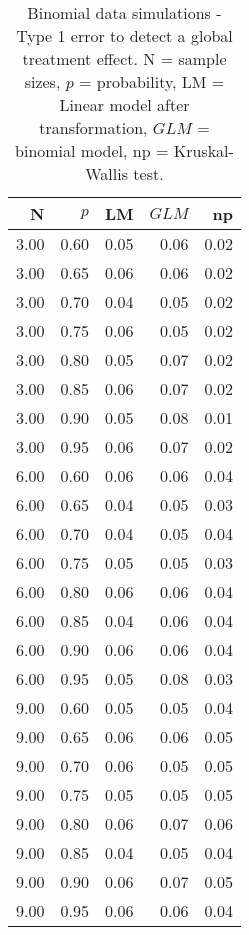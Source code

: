 \begin{table}
\centering
\caption[Binomial data simulations - Type 1 error to detect a global treatment effect.]{Binomial data simulations - Type 1 error to detect a global treatment effect. N = sample sizes, 
             $p$ = probability, LM = Linear model after transformation, 
             $GLM$ = binomial model, np = Kruskal-Wallis test.} 
\label{tab:t1_glob_p}
{\footnotesize
\begin{tabular}{rrrrr}
  \hline
N & $p$ & LM & $GLM$ & np \\ 
  \hline
3.00 & 0.60 & 0.05 & 0.06 & 0.02 \\ 
  3.00 & 0.65 & 0.06 & 0.06 & 0.02 \\ 
  3.00 & 0.70 & 0.04 & 0.05 & 0.02 \\ 
  3.00 & 0.75 & 0.06 & 0.05 & 0.02 \\ 
  3.00 & 0.80 & 0.05 & 0.07 & 0.02 \\ 
  3.00 & 0.85 & 0.06 & 0.07 & 0.02 \\ 
  3.00 & 0.90 & 0.05 & 0.08 & 0.01 \\ 
  3.00 & 0.95 & 0.06 & 0.07 & 0.02 \\ 
  6.00 & 0.60 & 0.06 & 0.06 & 0.04 \\ 
  6.00 & 0.65 & 0.04 & 0.05 & 0.03 \\ 
  6.00 & 0.70 & 0.04 & 0.05 & 0.04 \\ 
  6.00 & 0.75 & 0.05 & 0.05 & 0.03 \\ 
  6.00 & 0.80 & 0.06 & 0.06 & 0.04 \\ 
  6.00 & 0.85 & 0.04 & 0.06 & 0.04 \\ 
  6.00 & 0.90 & 0.06 & 0.06 & 0.04 \\ 
  6.00 & 0.95 & 0.05 & 0.08 & 0.03 \\ 
  9.00 & 0.60 & 0.05 & 0.05 & 0.04 \\ 
  9.00 & 0.65 & 0.06 & 0.06 & 0.05 \\ 
  9.00 & 0.70 & 0.06 & 0.05 & 0.05 \\ 
  9.00 & 0.75 & 0.05 & 0.05 & 0.05 \\ 
  9.00 & 0.80 & 0.06 & 0.07 & 0.06 \\ 
  9.00 & 0.85 & 0.04 & 0.05 & 0.04 \\ 
  9.00 & 0.90 & 0.06 & 0.07 & 0.05 \\ 
  9.00 & 0.95 & 0.06 & 0.06 & 0.04 \\ 
   \hline
\end{tabular}
}
\end{table}
